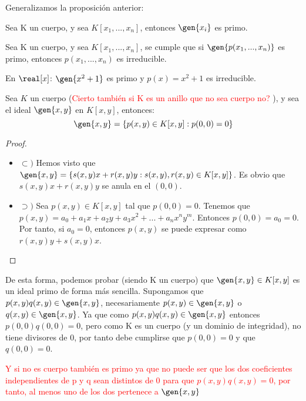 Generalizamos la proposición anterior:
\begin{prop}
	Sea K un cuerpo, y sea $K[x_1,...,x_n]$, entonces $\gen{x_i}$ es primo.
\end{prop}

\begin{prop}
	Sea K un cuerpo, y sea $K[x_1,...,x_n]$, se cumple que si $\gen{p(x_1,...,x_n)}$ es primo,  entonces $p(x_1,...,x_n)$ es irreducible.
\end{prop}

\begin{example}
	En $\real[x]$: $\gen{x^2+1}$ es primo y $p(x)=x^2+1$ es irreducible.
\end{example}

\begin{prop}
	Sea $K$ un cuerpo (\textcolor{red}{Cierto también si K es un anillo que no sea cuerpo no?} ), y sea el ideal $\gen{x,y}$ en $K[x,y]$, entonces:
	$$\gen{x,y}=\{p(x,y)\in K[x,y]:p(0,0)=0 \}$$
\end{prop}

\begin{proof}
	\begin{itemize}
		\item $\subset)$ Hemos visto que $\gen{x,y}=\{s(x,y) x+r(x,y) y: s(x,y),r(x,y) \in K[x,y] \}$. Es obvio que $s(x,y) x+r(x,y) y$ se anula en el $(0,0)$.
		\item $\supset)$ Sea $p(x,y) \in K[x,y]$ tal que $p(0,0)=0$. Tenemos que $p(x,y)=a_0+a_1x+a_2y+a_3x^2+...+a_nx^ny^m$. Entonces $p(0,0)=a_0=0$. Por tanto, si $a_0=0$, entonces $p(x,y)$ se puede expresar como $r(x,y)y+s(x,y)x$.
	\end{itemize}
\end{proof}

\obs De esta forma, podemos probar (siendo K un cuerpo) que $\gen{x,y} \in K[x,y]$ es un ideal primo de forma más sencilla. Supongamos que $p(x,y)q(x,y) \in \gen{x,y}$, necesariamente $p(x,y) \in \gen{x,y}$ o $q(x,y) \in \gen{x,y}$. Ya que como $p(x,y)q(x,y) \in \gen{x,y}$ entonces $p(0,0)q(0,0)=0$, pero como K es un cuerpo (y un dominio de integridad), no tiene divisores de 0, por tanto debe cumplirse que $p(0,0)=0$ y que $q(0,0)=0$.

\textcolor{red}{Y si no es cuerpo también es primo ya que no puede ser que los dos coeficientes independientes de p y q sean distintos de 0 para que $p(x,y)q(x,y)=0$, por tanto, al menos uno de los dos pertenece a $\gen{x,y}$}

